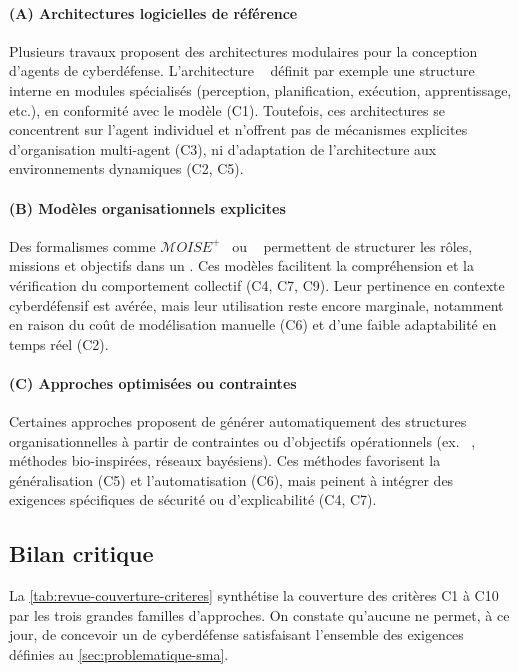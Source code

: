 \paragraph{(A) Architectures logicielles de référence}

Plusieurs travaux proposent des architectures modulaires pour la conception d'agents de cyberdéfense. L'architecture ~\cite{Kott2023} définit par exemple une structure interne en modules spécialisés (perception, planification, exécution, apprentissage, etc.), en conformité avec le modèle  (C1). Toutefois, ces architectures se concentrent sur l'agent individuel et n'offrent pas de mécanismes explicites d'organisation multi-agent (C3), ni d'adaptation de l'architecture aux environnements dynamiques (C2, C5).

\paragraph{(B) Modèles organisationnels explicites}

Des formalismes comme $\mathcal{M}OISE^+$~\cite{hubner2002moise} ou ~\cite{Ferber2004} permettent de structurer les rôles, missions et objectifs dans un . Ces modèles facilitent la compréhension et la vérification du comportement collectif (C4, C7, C9). Leur pertinence en contexte cyberdéfensif est avérée, mais leur utilisation reste encore marginale, notamment en raison du coût de modélisation manuelle (C6) et d'une faible adaptabilité en temps réel (C2).

\paragraph{(C) Approches optimisées ou contraintes}

Certaines approches proposent de générer automatiquement des structures organisationnelles à partir de contraintes ou d'objectifs opérationnels (ex. ~\cite{modi2005adopt}, méthodes bio-inspirées, réseaux bayésiens). Ces méthodes favorisent la généralisation (C5) et l'automatisation (C6), mais peinent à intégrer des exigences spécifiques de sécurité ou d'explicabilité (C4, C7).

\subsection*{Bilan critique}

La \autoref{tab:revue-couverture-criteres} synthétise la couverture des critères C1 à C10 par les trois grandes familles d'approches. On constate qu'aucune ne permet, à ce jour, de concevoir un  de cyberdéfense satisfaisant l'ensemble des exigences définies au \autoref{sec:problematique-sma}.

